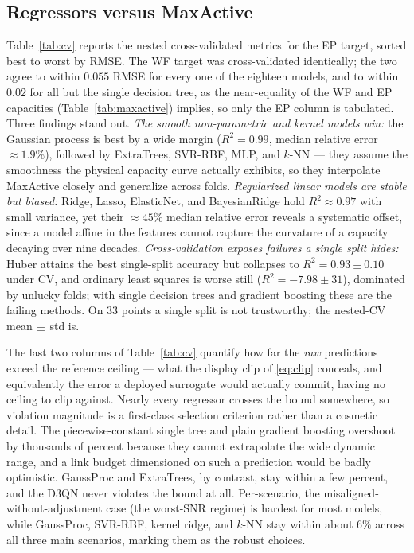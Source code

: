 \documentclass[journal]{IEEEtran}
\begin{document}
\subsection{Regressors versus MaxActive}
Table~\ref{tab:cv} reports the nested cross-validated metrics for the EP target, sorted
best to worst by RMSE. The WF target was cross-validated identically; the two agree to
within $0.055$ RMSE for every one of the eighteen models, and to within $0.02$ for all but
the single decision tree, as the near-equality of the WF and EP capacities
(Table~\ref{tab:maxactive}) implies, so only the EP column is tabulated. Three findings
stand out. \emph{The smooth non-parametric and
kernel models win:} the Gaussian process is best by a wide margin ($R^2=0.99$, median
relative error $\approx1.9\%$), followed by ExtraTrees, SVR-RBF, MLP, and $k$-NN --- they
assume the smoothness the physical capacity curve actually exhibits, so they interpolate
MaxActive closely and generalize across folds. \emph{Regularized linear models are stable
but biased:} Ridge, Lasso, ElasticNet, and BayesianRidge hold $R^2\approx0.97$ with small
variance, yet their $\approx45\%$ median relative error reveals a systematic offset,
since a model affine in the features cannot capture the curvature of a capacity decaying
over nine decades. \emph{Cross-validation exposes failures a single split hides:} Huber
attains the best single-split accuracy but collapses to $R^2=0.93\pm0.10$ under CV, and
ordinary least squares is worse still ($R^2=-7.98\pm31$), dominated by unlucky folds;
with single decision trees and gradient boosting these are the failing methods. On $33$
points a single split is not trustworthy; the nested-CV mean$\,\pm\,$std is.

The last two columns of Table~\ref{tab:cv} quantify how far the \emph{raw} predictions
exceed the reference ceiling --- what the display clip of \eqref{eq:clip} conceals, and
equivalently the error a deployed surrogate would actually commit, having no ceiling to
clip against. Nearly every regressor crosses the bound somewhere, so violation magnitude
is a first-class selection criterion rather than a cosmetic detail. The piecewise-constant
single tree and plain gradient boosting overshoot by thousands of percent because they
cannot extrapolate the wide dynamic range, and a link budget dimensioned on such a
prediction would be badly optimistic. GaussProc and ExtraTrees, by contrast, stay within a
few percent, and the D3QN never violates the bound at all. Per-scenario, the
misaligned-without-adjustment case (the worst-SNR regime) is hardest for most models,
while GaussProc, SVR-RBF, kernel ridge, and $k$-NN stay within about $6\%$ across all
three main scenarios, marking them as the robust choices.
\end{document}
